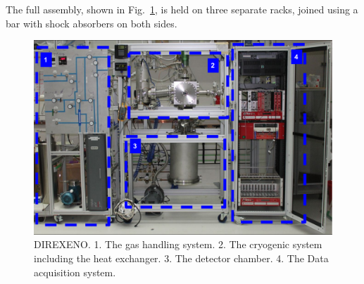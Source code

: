 The full assembly, shown in Fig.~\ref{fig:fulldet}, is held on three separate racks, joined using a bar with shock absorbers on both sides. 






\begin{figure}[h]
\centerline{\includegraphics[width=0.8\linewidth]{FullSys.png}}
\caption{DIREXENO. 1. The gas handling system. 2. The cryogenic system including the heat exchanger. 3. The detector chamber. 4. The Data acquisition system.}
\label{fig:fulldet}
\end{figure}




